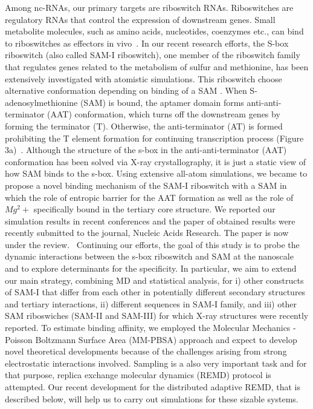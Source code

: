 \documentclass[a4paper,10pt]{article}
\begin{document}
Among nc-RNAs, our primary targets are riboswitch RNAs. Riboswitches are regulatory RNAs that control the expression of downstream genes. Small metabolite molecules, such as amino acids, nucleotides, coenzymes etc., can bind to riboswitches as effectors in vivo~\cite{mandal}.  In our recent research efforts, the S-box riboswitch (also called SAM-I riboswitch), one member of the riboswitch family that regulates genes related to the metabolism of sulfur and methionine, has been extensively investigated with atomistic simulations.  This riboswitch choose alternative conformation depending on binding of a SAM .  When S-adenosylmethionine (SAM) is bound, the aptamer domain forms anti-anti-terminator (AAT) conformation, which turns off the downstream genes by forming the terminator (T). Otherwise, the anti-terminator (AT) is formed prohibiting the T element formation for continuing transcription process (Figure 3a)~\cite{brooke}. Although the structure of the s-box in the anti-anti-terminator (AAT) conformation has been solved via X-ray crystallography, it is just a static view of how SAM binds to the s-box.  Using extensive all-atom simulations, we became to propose a novel binding mechanism of the SAM-I riboswitch with a SAM in which the role of entropic barrier for the AAT formation as well as the role of $Mg^2+$ specifically bound in the tertiary core structure.  We reported our simulation results in recent conferences and the paper of obtained results were recently submitted to the journal, Nucleic Acids Research.  The paper is now under the review.~\cite{SAM-I-NAR2009} Continuing our efforts, the goal of this study is to probe the dynamic interactions between the s-box riboswitch and SAM at the nanoscale and to explore determinants for the specificity. In particular, we aim to extend our main strategy, combining MD and statistical analysis, for i) other constructs of SAM-I that differ from each other in potentially different secondary structures and tertiary interactions, ii) different sequences in SAM-I family, and iii) other SAM riboswiches (SAM-II and SAM-III) for which X-ray structures were recently reported.  To estimate binding affinity, we employed the Molecular Mechanics - Poisson Boltzmann Surface Area (MM-PBSA) approach and expect to develop novel theoretical developments because of the challenges arising from strong electrostatic interactions involved.  Sampling is a also very important task and for that purpose, replica exchange molecular dynamics (REMD) protocol is attempted.  Our recent development for the distributed adaptive REMD, that is described below, will help us to carry out simulations for these sizable systems.
\end{document}
